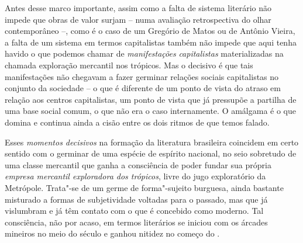 {Antes desse marco importante, assim como a falta de sistema literário
não impede que obras de valor surjam -- numa avaliação retrospectiva do
olhar contemporâneo --, como é o caso de um Gregório de Matos ou de
Antônio Vieira, a falta de um sistema em termos capitalistas também não
impede que aqui tenha havido o que podemos chamar de
\emph{manifestações} \emph{capitalistas} materializadas na chamada
exploração mercantil nos trópicos. Mas o decisivo é que tais
manifestações não chegavam a fazer germinar relações sociais
capitalistas no conjunto da sociedade -- o que é diferente de um ponto
de vista do atraso em relação aos centros capitalistas, um ponto de
vista que já pressupõe a partilha de uma base social comum, o que não
era o caso internamente. O amálgama é o que domina e continua ainda a
cisão entre os dois ritmos de que temos falado.

Esses \emph{momentos decisivos} na formação da literatura brasileira
coincidem em certo sentido com o germinar de uma espécie de espírito
nacional, no seio sobretudo de uma classe mercantil que ganha a
consciência de poder fundar sua própria \emph{empresa mercantil
exploradora dos trópicos}, livre do jugo exploratório da Metrópole.
Trata"-se de um germe de forma"-sujeito burguesa, ainda bastante misturado
a formas de subjetividade voltadas para o passado, mas que já vislumbram
e já têm contato com o que é concebido como moderno. Tal consciência,
não por acaso, em termos literários se iniciou com os árcades mineiros
no meio do século  e ganhou nitidez no começo do .

}
